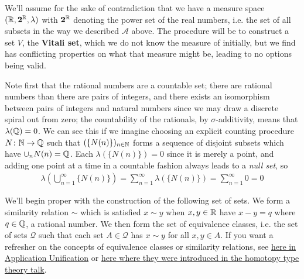 \documentclass[11pt]{article}
\begin{document}
We'll assume for the sake of contradiction that we have a measure space $(\mathbb{R}, \mathbf{2}^{\mathbb{R}}, \lambda)$ with $\mathbf 2^{\mathbb{R}}$ denoting the power set of the real numbers, i.e. the set of all subsets in the way we described $\mathcal A$ above. The procedure will be to construct a set $V$, the \textbf{Vitali set}, which we do not know the measure of initially, but we find has conflicting properties on what that measure might be, leading to no options being valid.

Note first that the rational numbers are a countable set; there are  rational numbers than there are pairs of integers, and there exists an isomorphism between pairs of integers and natural numbers since we may draw a discrete spiral out from zero; the countability of the rationals, by $\sigma$-additivity, means that $\lambda(\mathbb{Q}) = 0$. We can see this if we imagine choosing an explicit counting procedure $N\colon \mathbb{N} \to \mathbb{Q}$ such that $(\{N(n)\})_{n \in \mathbb{N}}$ forms a sequence of disjoint subsets which have $\cup_n N(n) = \mathbb{Q}$. Each $\lambda(\{N(n)\}) = 0$ since it is merely a point, and adding one point at a time in a countable fashion always leads to a \emph{null set}, so \begin{gather*}
\lambda \left( \bigcup_{n = 1}^\infty \{N(n)\}\right) = \sum_{n =1 }^\infty \lambda(\{N(n)\}) = \sum_{n=1}^\infty 0 = 0
\end{gather*}

We'll begin proper with the construction of the following set of sets. We form a similarity relation $\sim$ which is satisfied $x \sim y$ when $x,y \in \mathbb{R}$ have $x - y = q$ where $q \in \mathbb{Q}$, a rational number. We then form the set of equivalence classes, i.e. the set of sets $\mathcal Q$ such that each set $A \in \mathcal Q$ has $x\sim y$ for all $x,y \in A$. If you want a refresher on the concepts of equivalence classes or similarity relations, see \hyperlink{https://clockssugars.blog/appliuni/prelims/maththink.html\#EquivalenceRelation}{here in Application Unification} or \hyperlink{https://clockssugars.blog/articles/0326-homotopy-type-theory/}{here where they were introduced in the homotopy type theory talk}.
\end{document}

